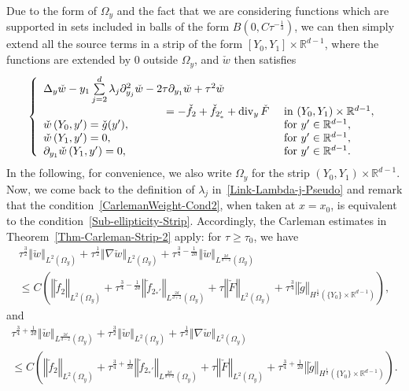 \documentclass[AHL,Unicode,longabstracts]{cedram}
\newcommand*\R{\mathbb{R}}
\newcommand{\norm}[1]{\left\Vert#1\right\Vert}
\renewcommand{\leq}{\leqslant}
\renewcommand{\geq}{\geqslant}
\newcommand{\divv}{\mathrm{div}}
\begin{document}
Due to the form of $\Omega_y$ and the fact that we are considering functions which are supported in sets included in balls of the form $B(0, C \tau^{-\frac{1}{3}})$, we can then simply extend all the source terms in a strip of the form $[Y_0, Y_1] \times \R^{d-1}$, where the functions are extended by $0$ outside $\Omega_y$, and $\check w$ then satisfies
\begin{equation}\label{Elliptic-Strip-check w}
\left\{
\begin{array}{ll}
\Delta_y \check w-y_{1} \sum\limits_{j=2}^{d} \lambda_{j} \partial_{y_j}^{2} \check w - 2 \tau \partial_{y_1} \check w + \tau^2 \check w \\
\mkern200mu=- \check f_2 + \check f_{2_*'} +\divv_y\, \check F & \text { in } (Y_0, Y_1) \times \R^{d-1},
\\
\check w\left(Y_{0}, y'\right)=\check g (y'), &\text{ for } y' \in \R^{d-1},
\\
\check w\left(Y_{1}, y'\right)= 0, &\text{ for } y' \in \R^{d-1},
\\
\partial_{y_1} \check w\left(Y_{1}, y'\right)= 0, &\text{ for } y' \in \R^{d-1}.
\end{array}
\right.
\end{equation}
In the following, for convenience, we also write $\Omega_y$ for the strip $(Y_0, Y_1) \times \R^{d-1}$. Now, we come back to the definition of $\lambda_j$ in~\eqref{Link-Lambda-j-Pseudo} and remark that the condition~\eqref{CarlemanWeight-Cond2}, when taken at $x = x_0$, is equivalent to the condition~\eqref{Sub-ellipticity-Strip}. Accordingly, the Carleman estimates in Theorem~\ref{Thm-Carleman-Strip-2} apply: for $\tau \geq \tau_0$, we have
\begin{multline*}
\tau^{\frac{3}{2}} \norm{\check w}_{L^2\left(\Omega_y\right)} +
\tau^{\frac{1}{2}} \norm{\nabla \check w}_{L^2\left(\Omega_y\right)} +
\tau^{\frac{3}{4}- \frac{1}{2d}} \norm{\check w}_{L^{\frac{2d}{d-2}}\left(\Omega_y\right)}
\\
\leq C\left(
\norm{\check f_2}_{L^2\left(\Omega_y\right)} +
\tau^{\frac{3}{4}- \frac{1}{2d}} \norm{\check f_{2_*'}}_{L^{\frac{2d}{d+2}}\left(\Omega_y\right)} +
\tau \norm{\check F}_{L^2\left(\Omega_y\right)} +
\tau^{\frac{3}{4}} \norm{\check g}_{H^{\frac{1}{2}}\left(\{Y_0\} \times \R^{d-1}\right)}
\right),
\end{multline*}
and
\begin{multline*}
\tau^{\frac{3}{4}+ \frac{1}{2d}} \norm{\check w}_{L^{\frac{2d}{d-2}}(\Omega_y)} +
\tau^{\frac{3}{2}} \norm{\check w }_{L^2(\Omega_y)} +
\tau^{\frac{1}{2}} \norm{ \nabla \check w}_{L^2(\Omega_y)}
\\
\leq C\left(
\norm{\check f_2}_{L^2(\Omega_y)} +
\tau^{\frac{3}{4}+ \frac{1}{2d}} \norm{ \check f_{2_*'} }_{L^{\frac{2d}{d+2}}(\Omega_y)} +
\tau \norm{ \check F }_{L^2(\Omega_y)} +
\tau^{\frac{3}{4}+\frac{1}{2d}} \norm{ \check g }_{H^{\frac{1}{2}}\left(\{Y_0\} \times \R^{d-1}\right)}
\right).
\end{multline*}
\end{document}
